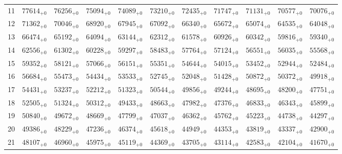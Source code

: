 \documentclass[10pt, a4paper]{article}
\begin{document}
\begin{center}
\begin{tabular}{c || c c c c c | c c c c c}
        \hline
        11 & \({77614}_{+0}\) & \({76256}_{+0}\) & \({75094}_{+0}\) & \({74089}_{+0}\) & \({73210}_{+0}\) & \({72435}_{+0}\) & \({71747}_{+0}\) & \({71131}_{+0}\) & \({70577}_{+0}\) & \({70076}_{+0}\)\\
        12 & \({71362}_{+0}\) & \({70046}_{+0}\) & \({68920}_{+0}\) & \({67945}_{+0}\) & \({67092}_{+0}\) & \({66340}_{+0}\) & \({65672}_{+0}\) & \({65074}_{+0}\) & \({64535}_{+0}\) & \({64048}_{+0}\)\\
        13 & \({66474}_{+0}\) & \({65192}_{+0}\) & \({64094}_{+0}\) & \({63144}_{+0}\) & \({62312}_{+0}\) & \({61578}_{+0}\) & \({60926}_{+0}\) & \({60342}_{+0}\) & \({59816}_{+0}\) & \({59340}_{+0}\)\\
        14 & \({62556}_{+0}\) & \({61302}_{+0}\) & \({60228}_{+0}\) & \({59297}_{+0}\) & \({58483}_{+0}\) & \({57764}_{+0}\) & \({57124}_{+0}\) & \({56551}_{+0}\) & \({56035}_{+0}\) & \({55568}_{+0}\)\\
        15 & \({59352}_{+0}\) & \({58121}_{+0}\) & \({57066}_{+0}\) & \({56151}_{+0}\) & \({55351}_{+0}\) & \({54644}_{+0}\) & \({54015}_{+0}\) & \({53452}_{+0}\) & \({52944}_{+0}\) & \({52484}_{+0}\)\\
        \hline
        16 & \({56684}_{+0}\) & \({55473}_{+0}\) & \({54434}_{+0}\) & \({53533}_{+0}\) & \({52745}_{+0}\) & \({52048}_{+0}\) & \({51428}_{+0}\) & \({50872}_{+0}\) & \({50372}_{+0}\) & \({49918}_{+0}\)\\
        17 & \({54431}_{+0}\) & \({53237}_{+0}\) & \({52212}_{+0}\) & \({51323}_{+0}\) & \({50544}_{+0}\) & \({49856}_{+0}\) & \({49244}_{+0}\) & \({48695}_{+0}\) & \({48200}_{+0}\) & \({47751}_{+0}\)\\
        18 & \({52505}_{+0}\) & \({51324}_{+0}\) & \({50312}_{+0}\) & \({49433}_{+0}\) & \({48663}_{+0}\) & \({47982}_{+0}\) & \({47376}_{+0}\) & \({46833}_{+0}\) & \({46343}_{+0}\) & \({45899}_{+0}\)\\
        19 & \({50840}_{+0}\) & \({49672}_{+0}\) & \({48669}_{+0}\) & \({47799}_{+0}\) & \({47037}_{+0}\) & \({46362}_{+0}\) & \({45762}_{+0}\) & \({45223}_{+0}\) & \({44738}_{+0}\) & \({44297}_{+0}\)\\
        20 & \({49386}_{+0}\) & \({48229}_{+0}\) & \({47236}_{+0}\) & \({46374}_{+0}\) & \({45618}_{+0}\) & \({44949}_{+0}\) & \({44353}_{+0}\) & \({43819}_{+0}\) & \({43337}_{+0}\) & \({42900}_{+0}\)\\
        \hline
        21 & \({48107}_{+0}\) & \({46960}_{+0}\) & \({45975}_{+0}\) & \({45119}_{+0}\) & \({44369}_{+0}\) & \({43705}_{+0}\) & \({43114}_{+0}\) & \({42583}_{+0}\) & \({42104}_{+0}\) & \({41670}_{+0}\)\\

\end{tabular}
\end{center}
\end{document}
